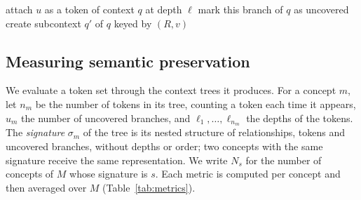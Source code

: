 \begin{algorithm}[t]
\caption{\textsc{Expand}$(u, q, \ell)$: builds the context tree of a concept $m$, called as \textsc{Expand}$(m, q_0, 0)$; $\ell$ counts the hops from $m$.}
\label{alg:expand}
\begin{algorithmic}[1]
     
        \State attach $u$ as a token of context $q$ at depth $\ell$
        \State \Return
    \EndIf
        \State mark this branch of $q$ as uncovered
        \State \Return
    \EndIf
            \State {} 
            \State create subcontext $q'$ of $q$ keyed by $(R, v)$
            \State {}
        \EndIf
    \EndFor
\EndProcedure
\end{algorithmic}
\end{algorithm}

\subsection{Measuring semantic preservation}
\label{sec:method:metrics}

We evaluate a token set through the context trees it produces.
For a concept $m$, let $n_m$ be the number of tokens in its tree, counting a token each time it appears, $u_m$ the number of uncovered branches, and $\ell_1, \dots, \ell_{n_m}$ the depths of the tokens.
The \emph{signature} $\sigma_m$ of the tree is its nested structure of relationships, tokens and uncovered branches, without depths or order; two concepts with the same signature receive the same representation.
We write $N_s$ for the number of concepts of $M$ whose signature is $s$.
Each metric is computed per concept and then averaged over $M$ (Table~\ref{tab:metrics}).

